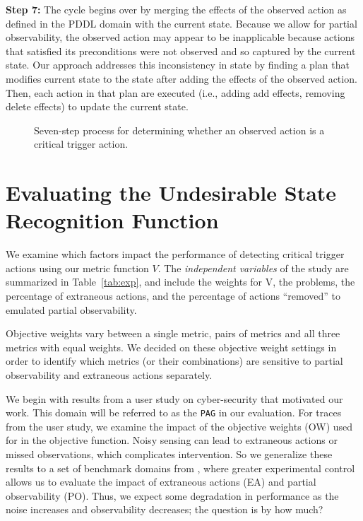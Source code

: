 \textbf{Step 7:} The cycle begins over by merging the effects of the observed action as defined in the PDDL domain with the current state. 
Because we allow for partial observability, the observed action may appear to be inapplicable because actions that satisfied its preconditions were not observed and so captured by the current state. Our approach addresses this inconsistency in state by finding a plan that modifies current state to the state after adding the effects of the observed action. Then, each action in that plan are executed (i.e., adding add effects, removing delete effects) to update the current state.

\begin{figure}[t]
\caption{Seven-step process for determining whether an observed action is a critical trigger action.}
\label{fig:components}
\end{figure}

\section{Evaluating the Undesirable State Recognition Function}
We examine which factors impact the performance of detecting critical trigger actions using our metric function $V$. The \emph{independent variables} of the study are summarized in Table~\ref{tab:exp}, and include the weights for V, the problems, the percentage of extraneous actions, and the percentage of actions ``removed'' to emulated partial observability.

Objective weights vary between a single metric, pairs of metrics and all three metrics with equal weights. We decided on these objective weight settings in order to identify which metrics (or their combinations) are sensitive to partial observability and extraneous actions separately. 


We begin with results from a user study on cyber-security that motivated our work. This domain will be referred to as the \texttt{PAG} in our evaluation. For traces from the user study, we examine the impact of the objective weights (OW) used for in the objective function. Noisy sensing can lead to extraneous actions or missed observations, which complicates intervention. So we generalize these results to a set of benchmark domains from \cite{ramirez2009plan}, where greater experimental control allows us to evaluate the impact of extraneous actions (EA) and partial observability (PO). Thus, we expect some degradation in performance as the noise increases and observability decreases; the question is by how much? 

